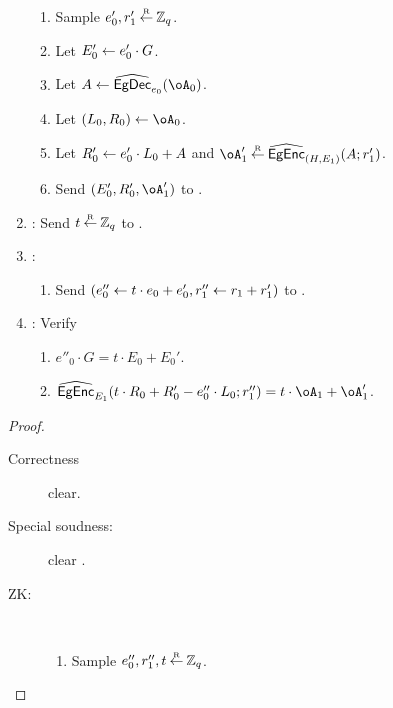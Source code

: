 \begin{description}
\begin{protocol}
\begin{enumerate}
\begin{enumerate}
				
				\item Sample $e'_0,r'_1\mathbin{\stackrel{\mbox{\tiny R}}{\leftarrow}}  {\mathbb Z}_q$.
				
				\item Let $E'_0 \leftarrow e'_0 \cdot G$.
				
				\item Let $A\asn \wEgDec_{e_0}(\oA_0)$.
				
				\item Let $(L_0,R_0) \asn \oA_0$.
				
				\item Let $R'_0 \leftarrow e_0' \cdot L_0  +A$ and $\oA_1' \getsr \wEgEnc_{(H,E_1)}(A;r'_1)$.
				
				\item Send $(E'_0,R_0',\oA_1')$ to \Vc.
			\end{enumerate}
			
			\item \Vc: Send $t\mathbin{\stackrel{\mbox{\tiny R}}{\leftarrow}} {\mathbb Z}_q$ to \Pc.
			
			\item \Pc: 
			\begin{enumerate}
			
				
				\item Send $(e''_0 \leftarrow t\cdot e_0 + e_0',r''_1 \leftarrow r_1 + r_1')$ to \Vc. 
			\end{enumerate}
		
		\item \Vc: Verify  
		
			\begin{enumerate}
			\item $e''_0\cdot G = t\cdot E_0 + E_0'$.
			
			\item  $\wEgEnc_{E_1}(t\cdot R_0 + R_0' - e''_0 \cdot L_0;r_1'') = t\cdot \oA_1 + \oA_1'$.
		\end{enumerate}
		\end{enumerate}
		
		
	\end{protocol}
	
	\begin{proof}
	\begin{description}
		\item[Correctness] clear.
		
		
		\item[Special soudness:] clear .
		
		\item[ZK:]~ 
		\begin{enumerate}
			\item Sample $e_0'',r_1'',t\mathbin{\stackrel{\mbox{\tiny R}}{\leftarrow}} {\mathbb Z}_q$.
			

\end{enumerate}
\end{description}
\end{proof}
\end{description}
